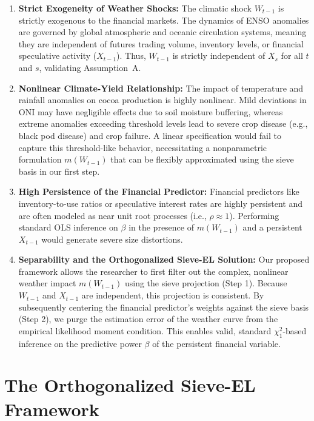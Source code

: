 \documentclass{article}
\begin{document}
\begin{enumerate}
    \item \textbf{Strict Exogeneity of Weather Shocks:} The climatic shock $W_{t-1}$ is strictly exogenous to the financial markets. The dynamics of ENSO anomalies are governed by global atmospheric and oceanic circulation systems, meaning they are independent of futures trading volume, inventory levels, or financial speculative activity ($X_{t-1}$). Thus, $W_{t-1}$ is strictly independent of $X_s$ for all $t$ and $s$, validating Assumption~A.
    
    \item \textbf{Nonlinear Climate-Yield Relationship:} The impact of temperature and rainfall anomalies on cocoa production is highly nonlinear. Mild deviations in ONI may have negligible effects due to soil moisture buffering, whereas extreme anomalies exceeding threshold levels lead to severe crop disease (e.g., black pod disease) and crop failure. A linear specification would fail to capture this threshold-like behavior, necessitating a nonparametric formulation $m(W_{t-1})$ that can be flexibly approximated using the sieve basis in our first step.
    
    \item \textbf{High Persistence of the Financial Predictor:} Financial predictors like inventory-to-use ratios or speculative interest rates are highly persistent and are often modeled as near unit root processes (i.e., $\rho \approx 1$). Performing standard OLS inference on $\beta$ in the presence of $m(W_{t-1})$ and a persistent $X_{t-1}$ would generate severe size distortions.
    
    \item \textbf{Separability and the Orthogonalized Sieve-EL Solution:} Our proposed framework allows the researcher to first filter out the complex, nonlinear weather impact $m(W_{t-1})$ using the sieve projection (Step 1). Because $W_{t-1}$ and $X_{t-1}$ are independent, this projection is consistent. By subsequently centering the financial predictor's weights against the sieve basis (Step 2), we purge the estimation error of the weather curve from the empirical likelihood moment condition. This enables valid, standard $\chi^2_1$-based inference on the predictive power $\beta$ of the persistent financial variable.
\end{enumerate}

\section{The Orthogonalized Sieve-EL Framework}
\end{document}
